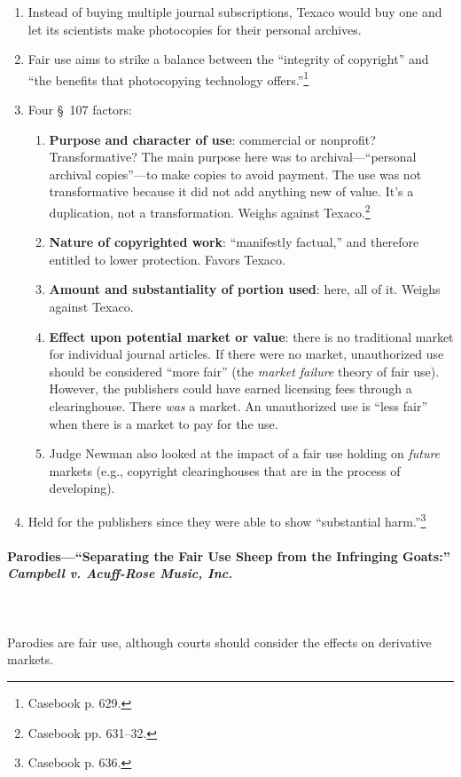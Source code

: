\begin{enumerate}
    \item Instead of buying multiple journal subscriptions, Texaco would buy 
    one and let its scientists make photocopies for their personal archives.
    \item Fair use aims to strike a balance between the ``integrity of 
    copyright'' and ``the benefits that photocopying technology 
    offers.''\footnote{Casebook p. 629.}
    \item Four \S\ 107 factors:
    \begin{enumerate}
        \item \textbf{Purpose and character of use}: commercial or nonprofit? 
        Transformative? The main purpose here was to archival---``personal 
        archival copies''---to make copies to avoid payment. The use was not 
        transformative because it did not add anything new of 
        value. It's a duplication, not a transformation. 
        Weighs against Texaco.\footnote{Casebook pp. 631--32.}
        \item \textbf{Nature of copyrighted work}: ``manifestly factual,'' and 
        therefore entitled to lower protection. Favors Texaco.
        \item \textbf{Amount and substantiality of portion used}: here, all of 
        it. Weighs against Texaco.
        \item \textbf{Effect upon potential market or value}: there is no 
        traditional market for individual journal articles. If there were no 
        market, unauthorized use should be considered ``more fair'' (the 
        \emph{market failure} theory of fair use). However, the publishers 
        could have earned licensing fees through a clearinghouse. There 
        \emph{was} a market. An unauthorized use is ``less fair'' when there 
        is a market to pay for the use.
        \item Judge Newman also looked at the impact of a fair use holding on 
        \emph{future} markets (e.g., copyright clearinghouses that are in the 
        process of developing).
    \end{enumerate}
    \item Held for the publishers since they were able to show ``substantial 
    harm.''\footnote{Casebook p. 636.}
\end{enumerate}

\newpage %

\paragraph{Parodies---``Separating the Fair Use Sheep from the Infringing 
Goats:'' \emph{Campbell v. Acuff-Rose Music, Inc.}}
~\\\\
Parodies are fair use, although courts should consider the effects on 
derivative markets.

